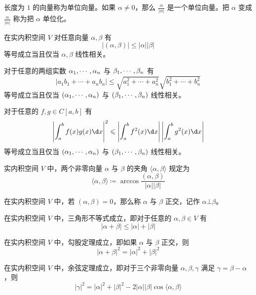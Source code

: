 长度为 $1$ 的向量称为单位向量。如果 $\alpha \ne 0$，那么 $\frac{\alpha}{|\alpha|}$ 是一个单位向量。把 $\alpha$ 变成 $\frac{\alpha}{|\alpha|}$ 称为把 $\alpha$ 单位化。

\begin{theorem}
	在实内积空间 $V$ 对任意向量 $\alpha,\beta$ 有
	\[ |(\alpha,\beta)| \leqslant |\alpha| |\beta| \]
	等号成立当且仅当 $\alpha,\beta$ 线性相关。
\end{theorem}

\begin{proposition}
	对于任意的两组实数 $\alpha_1,\cdots,\alpha_n$ 与  $\beta_1,\cdots,\beta_n$ 有
	\[ |a_1b_1 + \cdots + a_nb_n| \leqslant \sqrt{a_1^2 + \cdots + a_n^2}\sqrt{b_1^2 + \cdots + b_n^2} \]
	等号成立当且仅当 $(\alpha_1,\cdots,\alpha_n)$ 与 $(\beta_1,\cdots,\beta_n)$ 线性相关。
\end{proposition}

\begin{proposition}
	对于任意的 $f,g \in C[a,b]$ 有
	\[ \left| \int_a^b f(x)g(x) \d x \right|^2 \leqslant \left| \int_a^b f^2(x) \d x \right| \left| \int_a^b g^2(x) \d x \right| \]
	等号成立当且仅当 $(\alpha_1,\cdots,\alpha_n)$ 与 $(\beta_1,\cdots,\beta_n)$ 线性相关。
\end{proposition}

\begin{definition}
	实内积空间 $V$ 中，两个非零向量 $\alpha$ 与 $\beta$ 的夹角 $\langle\alpha,\beta\rangle$ 规定为
	\[ \langle\alpha,\beta\rangle \coloneqq \arccos \frac{(\alpha,\beta)}{|\alpha||\beta|} \]
\end{definition}

\begin{definition}
	在实内积空间 $V$ 中，若 $(\alpha,\beta) = 0$，那么称 $\alpha$ 与 $\beta$ 正交，记作 $\alpha \bot \beta$。
\end{definition}

\begin{proposition}
	在实内积空间 $V$ 中，三角形不等式成立，即对于任意的 $\alpha,\beta \in V$ 有
	\[ |\alpha+\beta| \leqslant |\alpha| + |\beta| \]
\end{proposition}

\begin{proposition}
	在实内积空间 $V$ 中，勾股定理成立，即如果 $\alpha$ 与 $\beta$ 正交，则
	\[ |\alpha + \beta|^2 = |\alpha|^2 + |\beta|^2 \]
\end{proposition}

\begin{proposition}
	在实内积空间 $V$ 中，余弦定理成立，即对于三个非零向量 $\alpha,\beta,\gamma$ 满足 $\gamma = \beta - \alpha$，则
	\[ |\gamma|^2  = |\alpha|^2 + |\beta|^2 - 2 |\alpha| |\beta| \cos\langle\alpha,\beta\rangle \]
\end{proposition}

